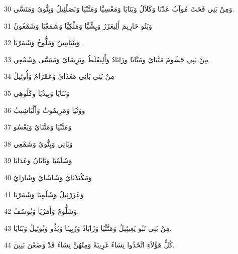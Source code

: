 \par 30 وَمِنْ بَنِي فَحَثَ مُوآبُ عَدْنَا وَكَلاَلُ وَبَنَايَا وَمَعْسِيَّا وَمَتَّنْيَا وَبَصَلْئِيلُ وَبِنُّويُ وَمَنَسَّى.
\par 31 وَبَنُو حَارِيمَ أَلِيعَزَرُ وَيِشِّيَّا وَمَلْكِيَّا وَشَمَعْيَا وَشَمْعُونُ
\par 32 وَبِنْيَامِينُ وَمَلُّوخُ وَشَمَرْيَا.
\par 33 مِنْ بَنِي حَشُومَ مَتَّنَايُ ومَتَّاثَا وزَابَادُ وَأَلِيفَلَطُ ويَرِيمَايُ وَمَنَسَّى وَشَمْعِي.
\par 34 مِنْ بَنِي بَانِي مَعَدَايُ وَعَمْرَامُ وَأُوئِيلُ
\par 35 وَبَنَايَا وَبِيدْيَا وكَلُوهِي
\par 36 ووَنْيَا وَمَرِيمُوثُ وَأَلْيَاشِيبُ
\par 37 وَمَتَّنْيَا وَمَتَّنَايُ وَيَعْسُو
\par 38 وَبَانِي وَبِنُّويُ وَشَمْعِي
\par 39 وَشَلَمْيَا وَنَاثَانُ وَعَدَايَا
\par 40 وَمَكْنَدْبَايُ وَشَاشَايُ وَشَارَايُ
\par 41 وَعَزَرْئِيلُ وَشَلْمِيَا وَشَمَرْيَا
\par 42 وَشَلُّومُ وَأَمَرْيَا وَيُوسُفُ.
\par 43 مِنْ بَنِي نَبُو يَعِيئِيلُ وَمَتَّثْيَا وَزَابَادُ وَزَبِينَا وَيَدُّو وَيُوئِيلُ وَبَنَايَا.
\par 44 كُلُّ هَؤُلاَءِ اتَّخَذُوا نِسَاءً غَرِيبَةً وَمِنْهُنَّ نِسَاءٌ قَدْ وَضَعْنَ بَنِينَ.

